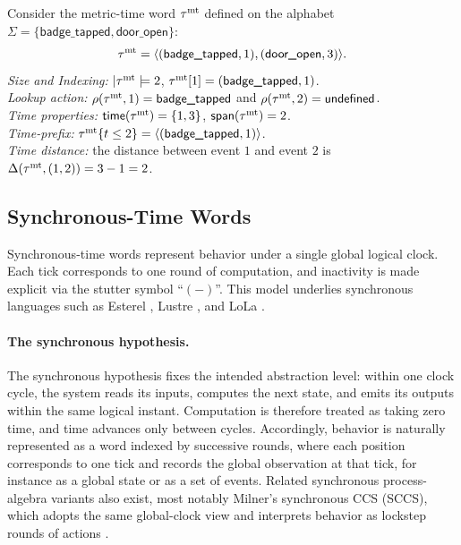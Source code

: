 \begin{example}
  Consider the metric-time word \(\tau^{\mathrm{mt}}\) defined on the alphabet $\Sigma=\{\textsf{badge\_tapped},\textsf{door\_open}\}$:
  \[
  \tau^{\mathrm{mt}}=\langle (\textsf{badge\_tapped},1),(\textsf{door\_open},3) \rangle .
  \]
  \emph{Size and Indexing:} \(|\tau^{\mathrm{mt}}|=2\), \(\tau^{\mathrm{mt}}[1]=(\textsf{badge\_tapped},1)\).\\
  \emph{Lookup action:} $\rho(\tau^{\mathrm{mt}},1)=\textsf{badge\_tapped}$ and $\rho(\tau^{\mathrm{mt}},2)= {\mathsf{undefined}}$.\\
  \emph{Time properties:} \(\mathsf{time}(\tau^{\mathrm{mt}})=\{1,3\}\), \(\mathsf{span}(\tau^{\mathrm{mt}})=2\).\\
  \emph{Time-prefix:} \(\tau^{\mathrm{mt}}\{t\le 2\}=\langle (\textsf{badge\_tapped},1) \rangle \).\\
  \emph{Time distance:} the distance between event $1$ and event $2$ is $\Delta(\tau^{\mathrm{mt}},(1,2))=3-1=2$.
\end{example}



\subsection{Synchronous-Time Words}
Synchronous-time words represent behavior under a single global logical clock. Each tick corresponds to one round of computation, and inactivity is made explicit via the stutter symbol ``$(-)$''. This model underlies synchronous languages such as Esterel \cite{berry1984esterel}, Lustre \cite{Halbwachs93}, and LoLa \cite{d2005lola,kallwies2024synchronous}.

\paragraph{The synchronous hypothesis.}
The synchronous hypothesis fixes the intended abstraction level: within one clock cycle, the system reads its inputs, computes the next state, and emits its outputs within the same logical instant. Computation is therefore treated as taking zero time, and time advances only between cycles. Accordingly, behavior is naturally represented as a word indexed by successive rounds, where each position corresponds to one tick and records the global observation at that tick, for instance as a global state or as a set of events. Related synchronous process-algebra variants also exist, most notably Milner's synchronous CCS (SCCS), which adopts the same global-clock view and interprets behavior as lockstep rounds of actions \cite{milner1983calculi}.


